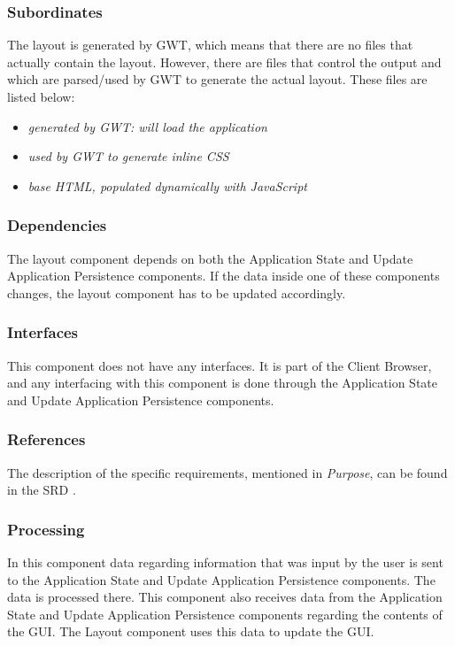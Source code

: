 \subsubsection*{Subordinates}
The layout is generated by GWT, which means that there are no files that actually contain the layout. However, there are files that control the output and which are parsed/used by GWT to generate the actual layout. These files are listed below:
\begin{itemize}
	\item {}  \emph{generated by GWT: will load the application}
	\item {}         \emph{used by GWT to generate inline CSS}
	\item {}        \emph{base HTML, populated dynamically with JavaScript}
\end{itemize}

\subsubsection*{Dependencies}
The layout component depends on both the Application State and Update Application Persistence components. If the data inside one of these components changes, the layout component has to be updated accordingly.

\subsubsection*{Interfaces}
This component does not have any interfaces. It is part of the Client Browser, and any interfacing with this component is done through the Application State and Update Application Persistence components.

\subsubsection*{References}
The description of the specific requirements, mentioned in \emph{Purpose}, can be found in the SRD \cite{srd}.

\subsubsection*{Processing}
In this component data regarding information that was input by the user is sent to the Application State and Update Application Persistence components. The data is processed there. This component also receives data from the Application State and Update Application Persistence components regarding the contents of the GUI. The Layout component uses this data to update the GUI.

